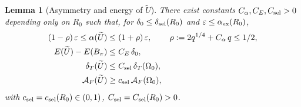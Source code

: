 \documentclass[11pt]{amsart}
\newtheorem{lemma}[theorem]{Lemma}
\newcommand{\dT}{\delta_T}
\newcommand{\AF}{\mathcal A_F}
\newcommand{\wt}{\widetilde}
\begin{document}
\begin{lemma}[Asymmetry and energy of \(\wt U\)]\label{lem:Utilde-quot}
There exist constants \(C_\alpha,C_E,C_{\rm sel}>0\) depending only on
\(R_0\) such that, for \(\delta_0\le\delta_{\rm sel}(R_0)\) and
\(\varepsilon\le\alpha_{\rm ex}(R_0)\),
\begin{align}
   (1-\rho)\,\varepsilon\le\alpha(\wt U)
      &\le(1+\rho)\,\varepsilon,
      &\rho:=2q^{1/4}+C_\alpha\,q\le 1/2,
   \label{eq:Lalpha}\\
   E(\wt U)-E(B_\pi)
      &\le C_E\,\delta_0,
   \label{eq:Lenergy}\\
   \dT(\wt U)
      &\le C_{\rm sel}\,\dT(\Omega_0),
   \label{eq:LdT}\\
   \AF(\wt U)
      &\ge c_{\rm sel}\,\AF(\Omega_0),
   \label{eq:LAF}
\end{align}
with \(c_{\rm sel}=c_{\rm sel}(R_0)\in(0,1)\), \(C_{\rm sel}=
C_{\rm sel}(R_0)>0\).
\end{lemma}
\end{document}
